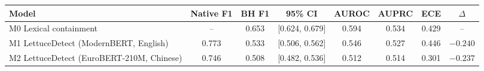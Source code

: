 \begin{tabular}{@{}lcccccc c@{}}
\toprule
Model & Native F1 & BH F1 & 95\% CI & AUROC & AUPRC & ECE & $\Delta$ \\
\midrule
M0 Lexical containment & -- & 0.653 & [0.624, 0.679] & 0.594 & 0.534 & 0.429 & -- \\
M1 LettuceDetect (ModernBERT, English) & 0.773 & 0.533 & [0.506, 0.562] & 0.546 & 0.527 & 0.446 & $-0.240$ \\
M2 LettuceDetect (EuroBERT-210M, Chinese) & 0.746 & 0.508 & [0.482, 0.536] & 0.512 & 0.514 & 0.301 & $-0.237$ \\
\bottomrule
\end{tabular}